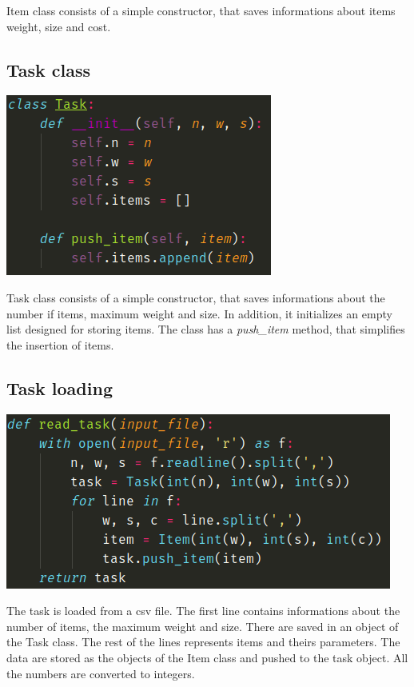 \documentclass[12pt]{article}
\begin{document}
Item class consists of a simple constructor, that saves informations about items weight, size and cost.

\subsection{Task class}
\begin{center}
	\includegraphics[scale=0.5]{task}
\end{center}

Task class consists of a simple constructor, that saves informations about the number if items, maximum weight and size. In addition, it
initializes an empty list designed for storing items. The class has a \emph{push\_item} method, that simplifies the insertion of items.

\subsection{Task loading}
\begin{center}
	\includegraphics[scale=0.5]{readtask}
\end{center}

The task is loaded from a csv file. The first line contains informations about the number of items, the maximum weight and size.
There are saved in an object of the Task class. The rest of the lines represents items and theirs parameters. The data are stored as the objects of the Item class and pushed to the task object. All the numbers are converted to integers.
\end{document}
